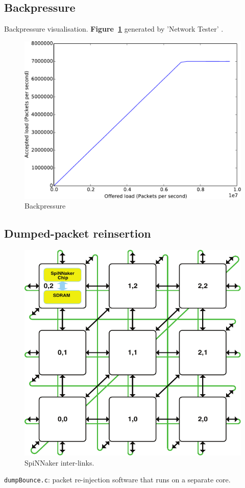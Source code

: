\documentclass[a4paper, 11pt]{article}
\begin{document}
\subsection{Backpressure}
Backpressure visualisation. \textbf{Figure~\ref{fig:backpressure}} generated by 'Network Tester' \citep[see][]{heathcote2015networktester}.
\begin{figure}[htbp]
	\centering
	\includegraphics[width=0.5\linewidth]{images/backpressure2.pdf}
	\caption{Backpressure}	
	\label{fig:backpressure}
\end{figure}

\subsection{Dumped-packet reinsertion}
\begin{figure}[b]
	\centering
	\includegraphics[width=0.35\linewidth]{images/system_architecture.pdf}
	\caption{SpiNNaker inter-links.}
	\label{fig:interchip_links}	
\end{figure}

\verb|dumpBounce.c|:  packet re-injection software that runs on a separate core.
 
\end{document}
